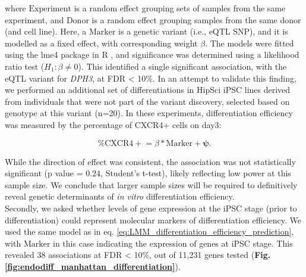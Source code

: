 where $\mathrm{Experiment}$ is a random effect grouping sets of samples from the same experiment, and $\mathrm{Donor}$ is a random effect grouping samples from the same donor (and cell line). 
Here, a $\mathrm{Marker}$ is a genetic variant (i.e., eQTL SNP), and it is modelled as a fixed effect, with corresponding weight $\beta$.
The models were fitted using the lme4 package in R \cite{bates2014fitting}, and significance was determined using a likelihood ratio test ($H_1: \beta \neq 0$).
This identified a single significant association, with the eQTL variant for \textit{DPH3}, at FDR < 10\%.
In an attempt to validate this finding, we performed an additional set of differentiations in HipSci iPSC lines derived from individuals that were not part of the variant discovery, selected based on genotype at this variant (n=20). 
In these experiments, differentiation efficiency was measured by the percentage of CXCR4+ cells on day3:

\begin{equation}
    \mathrm{\% CXCR4+} = \beta*\mathrm{Marker} + \boldsymbol{\psi}.
\end{equation}

While the direction of effect was consistent, the association was not statistically significant (p value = 0.24, Student’s t-test), likely reflecting low power at this sample size. 
We conclude that larger sample sizes will be required to definitively reveal genetic determinants of \textit{in vitro} differentiation efficiency.\\

Secondly, we asked whether levels of gene expression at the iPSC stage (prior to differentiation) could represent molecular markers of differentiation efficiency.
We used the same model as in eq. \eqref{eq:LMM_differentiation_efficiency_prediction}, with $\mathrm{Marker}$ in this case indicating the expression of genes at iPSC stage.
This revealed 38 associations at FDR < 10\%, out of 11,231 genes tested (\textbf{Fig. \ref{fig:endodiff_manhattan_differentiation}}).


